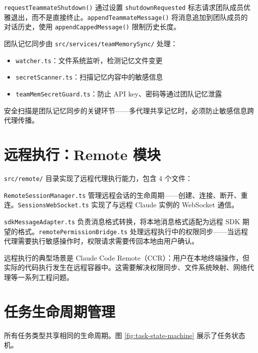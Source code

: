 \texttt{requestTeammateShutdown()} 通过设置 \texttt{shutdownRequested} 标志请求团队成员优雅退出，而不是直接终止。\texttt{appendTeammateMessage()} 将消息追加到团队成员的对话历史，使用 \texttt{appendCappedMessage()} 限制历史长度。

团队记忆同步由 \texttt{src/services/teamMemorySync/} 处理：

\begin{itemize}
  \item \texttt{watcher.ts}：文件系统监听，检测记忆文件变更
  \item \texttt{secretScanner.ts}：扫描记忆内容中的敏感信息
  \item \texttt{teamMemSecretGuard.ts}：防止 API key、密码等通过团队记忆泄露
\end{itemize}

安全扫描是团队记忆同步的关键环节——多代理共享记忆时，必须防止敏感信息跨代理传播。

\section{远程执行：Remote 模块}

\texttt{src/remote/} 目录实现了远程代理执行能力，包含 4 个文件：

\texttt{RemoteSessionManager.ts} 管理远程会话的生命周期——创建、连接、断开、重连。\texttt{SessionsWebSocket.ts} 实现了与远程 Claude 实例的 WebSocket 通信。

\texttt{sdkMessageAdapter.ts} 负责消息格式转换，将本地消息格式适配为远程 SDK 期望的格式。\texttt{remotePermissionBridge.ts} 处理远程执行中的权限同步——当远程代理需要执行敏感操作时，权限请求需要传回本地由用户确认。

远程执行的典型场景是 Claude Code Remote（CCR）：用户在本地终端操作，但实际的代码执行发生在远程容器中。这需要解决权限同步、文件系统映射、网络代理等一系列工程问题。

\section{任务生命周期管理}

所有任务类型共享相同的生命周期。图 \ref{fig:task-state-machine} 展示了任务状态机。

